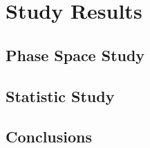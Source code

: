 \section{Study Results}
\begin{frame}{}
    \centering \Huge{}
\end{frame}

\subsection{Phase Space Study}


\subsection{Statistic Study}

\subsection{Conclusions}
